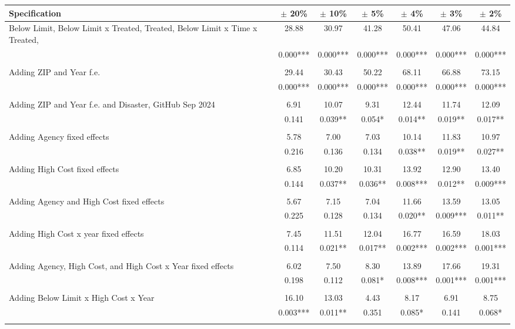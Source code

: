 \begin{tabular}{p{5cm}cccccc}
  \hline
Specification & $\pm$ 20\% & $\pm$ 10\% & $\pm$  5\% & $\pm$  4\% & $\pm$  3\% & $\pm$  2\% \\ 
  \hline
Below Limit, Below
Limit x Treated,
Treated, Below Limit
x Time x Treated, & 28.88 & 30.97 & 41.28 & 50.41 & 47.06 & 44.84 \\ 
   & 0.000*** & 0.000*** & 0.000*** & 0.000*** & 0.000*** & 0.000*** \\ 
   &  &  &  &  &  &  \\ 
  Adding ZIP and Year
f.e. & 29.44 & 30.43 & 50.22 & 68.11 & 66.88 & 73.15 \\ 
   & 0.000*** & 0.000*** & 0.000*** & 0.000*** & 0.000*** & 0.000*** \\ 
   &  &  &  &  &  &  \\ 
  Adding ZIP and Year
f.e. and Disaster,
GitHub Sep 2024 & 6.91 & 10.07 & 9.31 & 12.44 & 11.74 & 12.09 \\ 
   & 0.141 & 0.039** & 0.054* & 0.014** & 0.019** & 0.017** \\ 
   &  &  &  &  &  &  \\ 
  Adding Agency fixed
effects & 5.78 & 7.00 & 7.03 & 10.14 & 11.83 & 10.97 \\ 
   & 0.216 & 0.136 & 0.134 & 0.038** & 0.019** & 0.027** \\ 
   &  &  &  &  &  &  \\ 
  Adding High Cost
fixed effects & 6.85 & 10.20 & 10.31 & 13.92 & 12.90 & 13.40 \\ 
   & 0.144 & 0.037** & 0.036** & 0.008*** & 0.012** & 0.009*** \\ 
   &  &  &  &  &  &  \\ 
  Adding Agency and
High Cost fixed
effects & 5.67 & 7.15 & 7.04 & 11.66 & 13.59 & 13.05 \\ 
   & 0.225 & 0.128 & 0.134 & 0.020** & 0.009*** & 0.011** \\ 
   &  &  &  &  &  &  \\ 
  Adding High Cost x
year fixed effects & 7.45 & 11.51 & 12.04 & 16.77 & 16.59 & 18.03 \\ 
   & 0.114 & 0.021** & 0.017** & 0.002*** & 0.002*** & 0.001*** \\ 
   &  &  &  &  &  &  \\ 
  Adding Agency, High
Cost, and High Cost
x Year fixed effects & 6.02 & 7.50 & 8.30 & 13.89 & 17.66 & 19.31 \\ 
   & 0.198 & 0.112 & 0.081* & 0.008*** & 0.001*** & 0.001*** \\ 
   &  &  &  &  &  &  \\ 
  Adding Below Limit x
High Cost x Year & 16.10 & 13.03 & 4.43 & 8.17 & 6.91 & 8.75 \\ 
   & 0.003*** & 0.011** & 0.351 & 0.085* & 0.141 & 0.068* \\ 
   &  &  &  &  &  &  \\ 
   \hline
\end{tabular}

